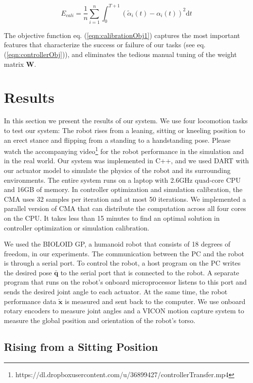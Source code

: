 \begin{equation}
  E_{cali}=\frac{1}{n}\sum_{i=1}^{n}\int_{0}^{T+1}(\tilde{\alpha}_i(t)-\alpha_i(t))^2\mathrm{d}t
  \label{eqn:calibrationObj1}
\end{equation}

The objective function eq. (\ref{eqn:calibrationObj1}) captures the most important features that characterize the success or failure of our tasks (see eq.(\ref{eqn:controllerObj})), and eliminates the tedious manual tuning of the weight matrix $\mathbf{W}$.

\section{Results}
In this section we present the results of our system. We use four locomotion tasks to test our system: The robot rises from a leaning, sitting or kneeling position to an erect stance and flipping from a standing to a handstanding pose. Please watch the accompanying video\footnote{https://dl.dropboxusercontent.com/u/36899427/controllerTransfer.mp4} for the robot performance in the simulation and in the real world. Our system was implemented in C++, and we used DART with our actuator model to simulate the physics of the robot and its surrounding environments. The entire system runs on a laptop with 2.6GHz quad-core CPU and 16GB of memory. In controller optimization and simulation calibration, the CMA uses 32 samples per iteration and at most 50 iterations. We implemented a parallel version of CMA that can distribute the computation across all four cores on the CPU. It takes less than 15 minutes to find an optimal solution in controller optimization or simulation calibration.

We used the BIOLOID GP, a humanoid robot that consists of 18 degrees of freedom, in our experiments. The communication between the PC and the robot is through a serial port. To control the robot, a host program on the PC writes the desired pose $\bar{\mathbf{q}}$ to the serial port that is connected to the robot. A separate program that runs on the robot's onboard microprocessor listens to this port and sends the desired joint angle to each actuator. At the same time, the robot performance data $\tilde{\mathbf{x}}$ is measured and sent back to the computer. We use onboard rotary encoders to measure joint angles and a VICON motion capture system to measure the global position and orientation of the robot's torso.

\subsection{Rising from a Sitting Position}

